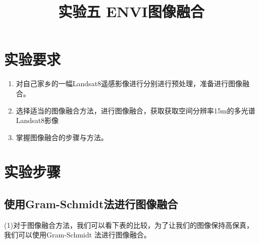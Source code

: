 \documentclass[12pt,a4paper]{article}
\title{\heiti 实验五 \quad ENVI图像融合}
\author{}
\date{ }
\begin{document}
	
	\maketitle	
	\setcounter{page}{38}
	
	
	\section{实验要求}
	\begin{enumerate}
		
		\item 对自己家乡的一幅Landsat8遥感影像进行分别进行预处理，准备进行图像融合。
		
		\item 选择适当的图像融合方法，进行图像融合，获取获取空间分辨率15m的多光谱Landsat8影像
		
		
		\item 掌握图像融合的步骤与方法。
		
		
		
	\end{enumerate}
	
	\section{实验步骤}
	
	\subsection{使用Gram-Schmidt法进行图像融合}
	
	

	(1)对于图像融合方法，我们可以看下表的比较，为了让我们的图像保持高保真，我们可以使用Gram-Schmidt 法进行图像融合。
	
	
\end{document}

